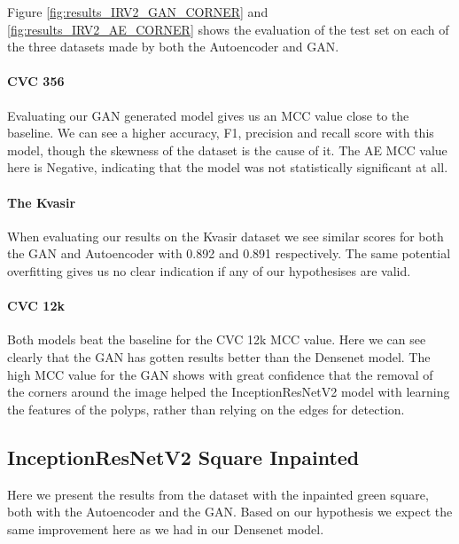 %
\noindent Figure \ref{fig:results_IRV2_GAN_CORNER} and \ref{fig:results_IRV2_AE_CORNER} shows the evaluation of the test set on each of the three datasets made by both the Autoencoder and GAN. 

\paragraph{CVC 356}
Evaluating our GAN generated model gives us an MCC value close to the baseline. We can see a higher accuracy, F1, precision and recall score with this model, though the skewness of the dataset is the cause of it. 
The AE MCC value here is Negative, indicating that the model was not statistically significant at all. 

\paragraph{The Kvasir}
When evaluating our results on the Kvasir dataset we see similar scores for both the GAN and Autoencoder with 0.892 and 0.891 respectively.  The same potential overfitting gives us no clear indication if any of our hypothesises are valid.

\paragraph{CVC 12k}
Both models beat the baseline for the CVC 12k MCC value. Here we can see clearly that the GAN has gotten results better than the Densenet model.
The high MCC value for the GAN shows with great confidence that the removal of the corners around the image helped the InceptionResNetV2 model with learning the features of the polyps, rather than relying on the edges for detection.









\subsection{InceptionResNetV2 Square Inpainted}

Here we present the results from the dataset with the inpainted green square, both with the Autoencoder and the GAN.  
Based on our hypothesis we expect the same improvement here as we had in our Densenet model.  

 

